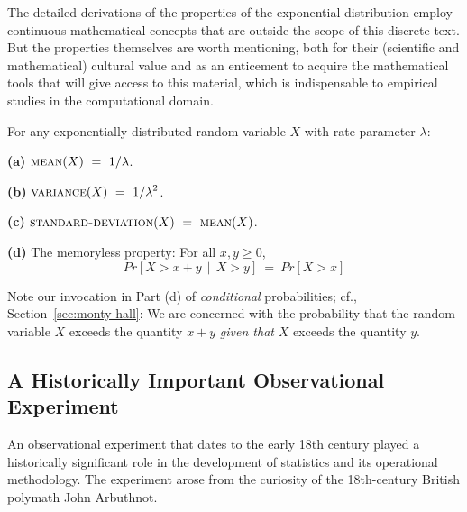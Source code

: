  
 

The detailed derivations of the properties of the exponential distribution employ continuous mathematical concepts that are outside the scope of this discrete text.  But the properties themselves are worth mentioning, both for their (scientific and mathematical) cultural value and as an enticement to acquire the mathematical tools that will give access to this material, which is indispensable to empirical studies in the computational domain.

\begin{prop}
\label{thm:exponential-moments}
For any exponentially distributed random variable $X$ with rate parameter $\lambda$:

{\bf (a)}
$\displaystyle \mbox{\sc mean}(X) \ = \ 1 / \lambda$.

\smallskip

{\bf (b)}
$\displaystyle \mbox{\sc variance}(X) \ = \ 1 / \lambda^2$.

\smallskip

{\bf (c)}
$\displaystyle  \mbox{\sc standard-deviation}(X) \ = \  \mbox{\sc mean}(X)$.

\medskip

{\bf (d)}
The memoryless property:  For all $x, y \geq 0$,
\[ Pr[X > x+y \ \ | \ \ X > y] \ = \ Pr[X > x] \]
\end{prop}

Note our invocation in Part (d) of {\em conditional} probabilities; cf.,
Section~\ref{sec:monty-hall}: We are concerned with the probability
that the random variable $X$ exceeds the quantity $x+y$ {\em given
  that} $X$ exceeds the quantity $y$.


\subsection{A Historically Important Observational Experiment}
\label{sec:Arbuthnot}

An observational experiment that dates to the early 18th century played a historically significant role in the development of statistics and its operational methodology.  The experiment arose from the curiosity of the 18th-century British polymath John Arbuthnot.

\smallskip

